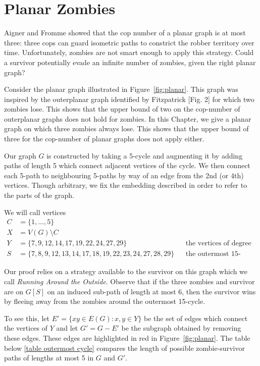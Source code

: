 \chapter{Planar Zombies}\label{chapter planar zombies}

Aigner and Fromme \cite{aigner1984game} showed that the cop number of a planar graph is at most three:
three cops can guard isometric paths to constrict the robber territory over time.
Unfortunately, zombies are not smart enough to apply this strategy. Could a survivor
potentially evade an infinite number of zombies, given the right planar graph?

Consider the planar graph illustrated in Figure~\ref{fig:planar}. This graph was inspired by the outerplanar graph identified by Fitzpatrick \cite{fitzpatrick2016deterministic}[Fig. 2] for which two zombies lose. This shows that the upper bound of two on the cop-number of outerplanar graphs does not hold for zombies. In this Chapter, we give a planar graph on which three zombies always lose. This shows that the upper bound of three for the cop-number of planar graphs does not apply either.

Our graph $G$ is constructed by taking a 5-cycle and augmenting it by adding paths of length 5 which
connect adjacent vertices of the cycle. We then connect each 5-path to neighbouring 5-paths by way of an edge from the 2nd (or 4th) vertices. Though arbitrary, we fix the embedding described in order to refer to the parts of the graph.

We will call vertices
\begin{align*}
C &= \{ 1, \dots, 5 \} \\
X &= V(G) \setminus C \\
Y &= \{7, 9, 12, 14, 17, 19, 22, 24, 27, 29\} && \text{the vertices of degree 3.} \\
S &= \{ 7,8,9,12,13,14,17,18,19, 22,23,24,27,28,29 \} && \text{the outermost 15-cycle}
\end{align*}

Our proof relies on a strategy available to the survivor on this graph which we call \textit{Running Around the Outside}. Observe that if the three zombies and survivor are on $G[S]$ on an induced sub-path of length at most 6, then the survivor wins by fleeing away from the zombies around the outermost 15-cycle.

To see this, let $E' = \{xy \in E(G) : x, y \in Y\}$ be the set of edges which connect the vertices of $Y$ and let $G' = G - E'$ be the subgraph obtained by removing these edges. These edges are highlighted in red in Figure~\ref{fig:planar}.
The table below \ref{table outermost cycle} compares the length of possible zombie-survivor paths of
lengths at most 5 in $G$ and $G'$.

